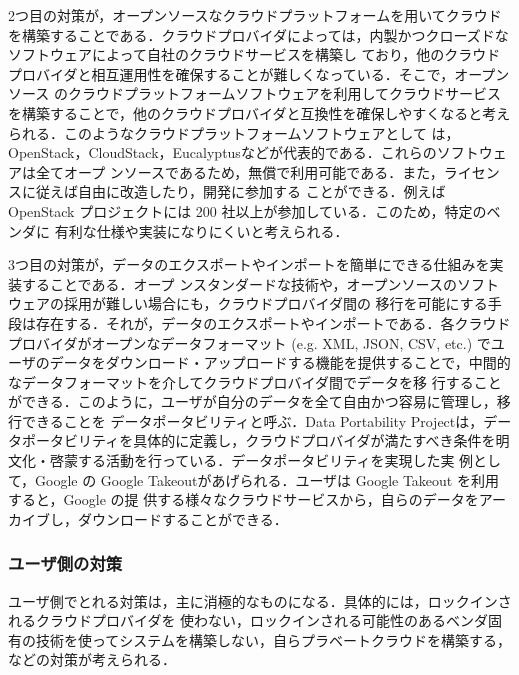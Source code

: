 2つ目の対策が，オープンソースなクラウドプラットフォームを用いてクラウドを構築することである．クラウドプロバイダによっては，内製かつクローズドなソフトウェアによって自社のクラウドサービスを構築し ており，他のクラウドプロバイダと相互運用性を確保することが難しくなっている．そこで，オープンソース のクラウドプラットフォームソフトウェアを利用してクラウドサービスを構築することで，他のクラウドプロバイダと互換性を確保しやすくなると考えられる．このようなクラウドプラットフォームソフトウェアとして は，OpenStack\cite{openstack}，CloudStack\cite{cloudstack}，Eucalyptus\cite{eucalyptus}などが代表的である．これらのソフトウェアは全てオープ ンソースであるため，無償で利用可能である．また，ライセンスに従えば自由に改造したり，開発に参加する ことができる．例えば OpenStack プロジェクトには 200 社以上が参加している．このため，特定のベンダに 有利な仕様や実装になりにくいと考えられる．

3つ目の対策が，データのエクスポートやインポートを簡単にできる仕組みを実装することである．オープ ンスタンダードな技術や，オープンソースのソフトウェアの採用が難しい場合にも，クラウドプロバイダ間の 移行を可能にする手段は存在する．それが，データのエクスポートやインポートである．各クラウドプロバイダがオープンなデータフォーマット (e.g. XML, JSON, CSV, etc.) でユーザのデータをダウンロード・アップロードする機能を提供することで，中間的なデータフォーマットを介してクラウドプロバイダ間でデータを移 行することができる．このように，ユーザが自分のデータを全て自由かつ容易に管理し，移行できることを データポータビリティと呼ぶ．Data Portability Project\cite{dataportability}は，データポータビリティを具体的に定義し，クラウドプロバイダが満たすべき条件を明文化・啓蒙する活動を行っている．データポータビリティを実現した実 例として，Google の Google Takeout\cite{takeout}があげられる．ユーザは Google Takeout を利用すると，Google の提 供する様々なクラウドサービスから，自らのデータをアーカイブし，ダウンロードすることができる．

\subsubsection{ユーザ側の対策}

ユーザ側でとれる対策は，主に消極的なものになる．具体的には，ロックインされるクラウドプロバイダを
使わない，ロックインされる可能性のあるベンダ固有の技術を使ってシステムを構築しない，自らプラベートクラウドを構築する，などの対策が考えられる．
